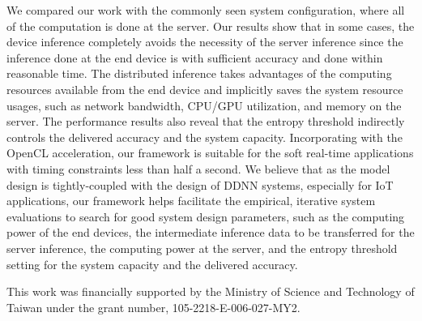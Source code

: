 \documentclass[format=acmsmall, review=false, screen=true]{acmart}
\begin{document}
We compared our work with the commonly seen system configuration, where all of the computation is done at the server.
Our results show that in some cases, the device inference completely avoids the necessity of the server inference since the inference done at the end device is with sufficient accuracy and done within reasonable time. The distributed inference takes advantages of the computing resources available from the end device and implicitly saves the system resource usages, such as network bandwidth, CPU/GPU utilization, and memory on the server. %
The performance results also reveal that the entropy threshold indirectly controls the delivered accuracy and the system capacity.
Incorporating with the OpenCL acceleration, our framework is suitable for the soft real-time applications with timing constraints less than half a second.
We believe that as the model design is tightly-coupled with the design of DDNN systems, especially for IoT applications, our framework helps facilitate the empirical, iterative system evaluations to search for good system design parameters, such as the computing power of the end devices, the intermediate inference data to be transferred for the server inference, the computing power at the server, and the entropy threshold setting for the system capacity and the delivered accuracy.





\begin{acks}

This work was financially supported by the Ministry of Science and Technology of Taiwan under the grant number, 105-2218-E-006-027-MY2.

\end{acks}


%

\end{document}
